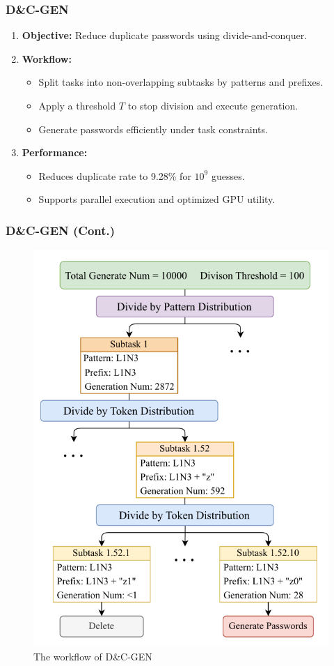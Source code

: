 \documentclass[
	12pt, %
]{beamer}
\begin{document}
\begin{frame}
	\frametitle{D\&C-GEN}
	
	\begin{enumerate}
		\item \textbf{Objective:} Reduce duplicate passwords using divide-and-conquer.
		
		\item \textbf{Workflow:}
		\begin{itemize}
			\item Split tasks into non-overlapping subtasks by patterns and prefixes.
			\item Apply a threshold $T$ to stop division and execute generation.
			\item Generate passwords efficiently under task constraints.
		\end{itemize}
		
		\item \textbf{Performance:}
		\begin{itemize}
			\item Reduces duplicate rate to 9.28\% for $10^9$ guesses.
			\item Supports parallel execution and optimized GPU utility.
		\end{itemize}
	\end{enumerate}
\end{frame}


\begin{frame}
	\frametitle{D\&C-GEN (Cont.)}
	
	
	\begin{figure}
		\centering
		\includegraphics[width=0.5\linewidth]{Images/img6}
		\caption{The workflow of D\&C-GEN}
		\label{fig:The workflow of D&C-GEN}
	\end{figure}
	
\end{frame}
\end{document}
